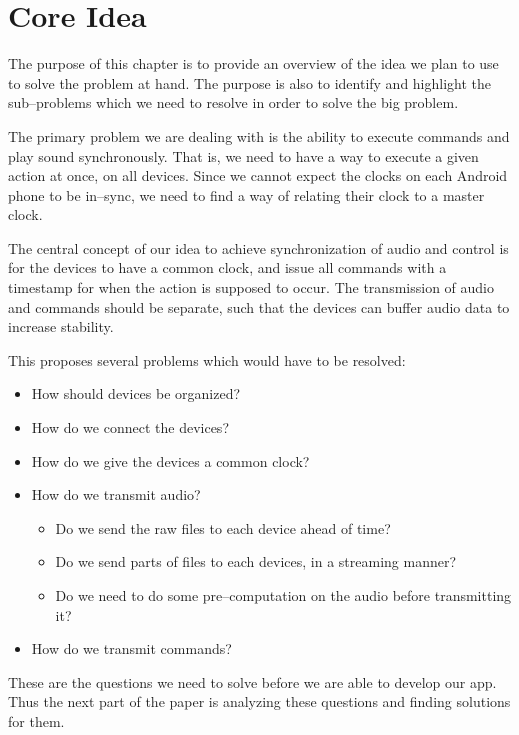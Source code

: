 \chapter{Core Idea} %

The purpose of this chapter is to provide an overview of the idea we plan to use to solve the problem at hand. 
The purpose is also to identify and highlight the sub--problems which we need to resolve in order to solve the big problem.

The primary problem we are dealing with is the ability to execute commands and play sound synchronously.
That is, we need to have a way to execute a given action at once, on all devices.
Since we cannot expect the clocks on each Android phone to be in--sync, we need to find a way of relating their clock to a master clock. 

The central concept of our idea to achieve synchronization of audio and control is for the devices to have a common clock, and issue all commands with a timestamp for when the action is supposed to occur. 
The transmission of audio and commands should be separate, such that the devices can buffer audio data to increase stability. 

This proposes several problems which would have to be resolved:
\begin{itemize}
    \item How should devices be organized?
    \item How do we connect the devices?
    \item How do we give the devices a common clock?
    \item How do we transmit audio?
    \begin{itemize}
        \item Do we send the raw files to each device ahead of time?
        \item Do we send parts of files to each devices, in a streaming manner?
        \item Do we need to do some pre--computation on the audio before transmitting it?
    \end{itemize}
    \item How do we transmit commands?
\end{itemize}

These are the questions we need to solve before we are able to develop our app. 
Thus the next part of the paper is analyzing these questions and finding solutions for them. 

